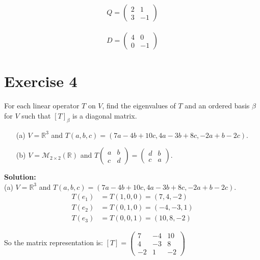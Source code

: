 \documentclass{article}
\begin{document}
\begin{align*}
Q = \begin{pmatrix} 2 & 1 \\ 3 & -1 \end{pmatrix}
\end{align*}

\begin{align*}
D = \begin{pmatrix} 4 & 0 \\ 0 & -1 \end{pmatrix}
\end{align*}

\newpage

\section*{Exercise 4}
For each linear operator $T$ on $V$, find the eigenvalues of $T$ and an ordered basis $\beta$ for $V$ such that $[T]_\beta$ is a diagonal matrix.

\begin{enumerate}
    \item[(a)] $V = \mathbb{R}^3$ and $T(a,b,c) = (7a - 4b + 10c, 4a - 3b + 8c, -2a + b - 2c)$.

    \item[(b)] $V = \mathcal{M}_{2\times 2}(\mathbb{R})$ and $T\begin{pmatrix} a & b \\ c & d \end{pmatrix} = \begin{pmatrix} d & b \\ c & a \end{pmatrix}$.
\end{enumerate}

\textbf{Solution:} \\

(a) $V = \mathbb{R}^3$ and $T(a,b,c) = (7a - 4b + 10c, 4a - 3b + 8c, -2a + b - 2c)$.
\begin{align*}
T(e_1) &= T(1,0,0) = (7, 4, -2) \\
T(e_2) &= T(0,1,0) = (-4, -3, 1) \\
T(e_3) &= T(0,0,1) = (10, 8, -2)
\end{align*}

So the matrix representation is:
$[T] = \begin{pmatrix} 7 & -4 & 10 \\ 4 & -3 & 8 \\ -2 & 1 & -2 \end{pmatrix}$
\end{document}
